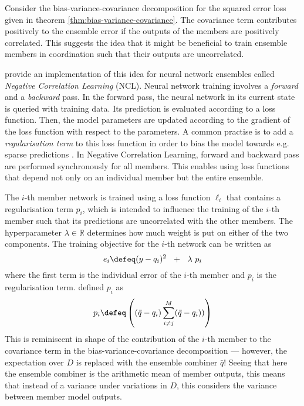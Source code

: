 \documentclass[../main.tex]{subfiles}
\begin{document}
Consider the bias-variance-covariance decomposition for the squared error loss given in theorem \ref{thm:bias-variance-covariance}.
The covariance term contributes positively to the ensemble error if the outputs of the members are positively  correlated. This suggests the idea that it might be beneficial to train ensemble members in coordination such that their outputs are uncorrelated.

\cite{LiuYao} provide an implementation of this idea for neural network ensembles called \textit{Negative Correlation Learning} (NCL).
Neural network training involves a \textit{forward} and a \textit{backward} pass. In the forward pass, the neural network in its current state is queried with training data. Its prediction is evaluated according to a loss function. 
Then, the model parameters are updated according to the gradient of the loss function with respect to the parameters. 
%
A common practise is to add a \textit{regularisation term} to this loss function in order to bias the model towards e.g. sparse predictions \cite{todo}. 
%
In Negative Correlation Learning, forward and backward pass are performed synchronously for all members. This enables using loss functions that depend not only on an individual member but the entire ensemble.

The $i$-th member network is trained using a loss function $\ell_{i}$ that contains a regularisation term $p_{i}$, which is intended to influence the training of the $i$-th member such that its predictions are uncorrelated with the other members. The hyperparameter $\lambda \in \mathbb{R}$ determines how much weight is put on either of the two components. The training objective for the $i$-th network can be written as
$$
 e_i \defeq ( y - q_{i})^2 ~ ~ + ~ ~ \lambda ~ p_{i}
$$
where the first term is the individual error of the $i$-th member and $p_i$ is the regularisation term. \cite{LiuYao} defined $p_i$ as
$$
p_{i} \defeq \left( 
(\bar{q} - q_i)
\sum_{i \not=j}^M (\bar{q} - q_i))
\right)
$$
This is reminiscent in shape of the contribution of the $i$-th member to the covariance term in the bias-variance-covariance decomposition --- however, the expectation over $D$ is replaced with the ensemble combiner $\bar{q}$! Seeing that here the ensemble combiner is the arithmetic mean of member outputs, this means that instead of a variance under variations in $D$, this considers the variance between member model outputs. 
\end{document}
